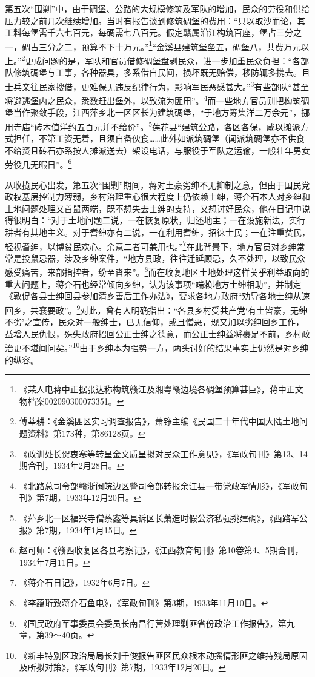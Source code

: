 第五次“围剿”中，由于碉堡、公路的大规模修筑及军队的增加，民众的劳役和供给压力较之前几次继续增加。当时有报告谈到修筑碉堡的费用：“只以取沙而论，其工料每堡需千六七百元，每碉需七八百元。假定赣属沿江构筑百座，堡占三分之一，碉占三分之二，预算不下十万元。”\footnote{《某人电蒋中正据张达称构筑赣江及湘粤赣边境各碉堡预算甚巨》，蒋中正文物档案002090300073351。}“金溪县建筑堡垒五，碉堡八，共费万元以上。”\footnote{傅莘耕：《金溪匪区实习调查报告》，萧铮主编《民国二十年代中国大陆土地问题资料》第173种，第86128页。}更成问题的是，军队和官员借修碉堡盘剥民众，进一步加重民众负担：“各部队修筑碉堡与工事，各种器具，多系借自民间，损坏既无赔偿，移防辄多携去。且士兵亲往民家搜借，更难保无违反纪律行为，影响军民恶感甚大。”\footnote{《政训处长贺衷寒等转呈金文质呈拟对民众工作意见》，《军政旬刊》第13、14期合刊，1934年2月28日。}有些部队“甚至将避逃堡内之民众，悉数赶出堡外，以致流为匪用”。\footnote{《北路总司令部赣浙闽皖边区警司令部转报余江县一带党政军情形》，《军政旬刊》第7期，1933年12月20日。}而一些地方官员则把构筑碉堡当作聚敛手段，江西萍乡北一区区长为建筑碉堡，“于地方筹集洋二万余元”，挪用寺庙“砖木值洋约五百元并不给价”。\footnote{《萍乡北一区福兴寺僧蔡鑫等具诉区长萧造时假公济私强挑建碉》，《西路军公报》第7期，1934年1月15日。}莲花县“建筑公路，各区各保，咸以摊派方式担任，不第工资无着，且须自备伙食……此外如派筑碉堡（闻派筑碉堡亦不供食不给资且砖石亦系按人摊派送去）架设电话，与服役于军队之运输，一般壮年男女劳役几无暇日”。\footnote{赵可师：《赣西收复区各县考察记》，《江西教育旬刊》第10卷第4、5期合刊，1934年7月11日。}


从收揽民心出发，第五次“围剿”期间，蒋对土豪劣绅不无抑制之意，但由于国民党政权基层控制力薄弱，乡村治理重心很大程度上仍依赖士绅，蒋介石本人对乡绅和土地问题处理又首鼠两端，既不想失去士绅的支持，又想讨好民众，他在日记中说得很明白：“对于土地问题二说，一在恢复原状，归还地主；一在设施新法，实行耕者有其地主义。对于耆绅亦有二说，一在利用耆绅，招徕士民；一在注重贫民，轻视耆绅，以博贫民欢心。余意二者可兼用也。”\footnote{《蒋介石日记》，1932年6月7日。}在此背景下，地方官员对乡绅常常是投鼠忌器，涉及乡绅案件，“地方县政，往往迁延顾忌，久不处理，以致民众感受痛苦，来部指控者，纷至沓来”。\footnote{《李蕴珩致蒋介石鱼电》，《军政旬刊》第3期，1933年11月10日。}而在收复地区土地处理这样关乎利益取向的重大问题上，蒋介石也经常倾向乡绅，认为该事项“端赖地方士绅相助”，并制定《敦促各县士绅回县参加清乡善后工作办法》，要求各地方政府“劝导各地士绅从速回乡，共襄要政”。\footnote{《国民政府军事委员会委员长南昌行营处理剿匪省份政治工作报告》，第九章，第39～40页。}对此，曾有人明确指出：“各县乡村受共产党‘有土皆豪，无绅不劣’之宣传，民众对一般绅士，已无信仰，或且憎恶，现又加以劣绅回乡工作，益增人民仇恨，殊失政府招回公正士绅之德意，而公正士绅益将裹足不前，乡村政治更不堪闻问矣。”\footnote{《新丰特别区政治局局长刘千俊报告匪区民众根本动摇情形匪之维持残局原因及所拟对策》，《军政旬刊》第7期，1933年12月20日。}由于乡绅本为强势一方，两头讨好的结果事实上仍然是对乡绅的纵容。


